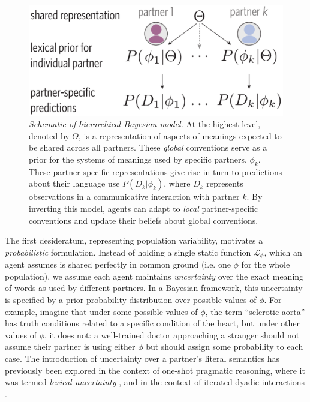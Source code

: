 \begin{figure}[t!]
\centering
\includegraphics[scale=0.35]{./figures/task1_model.pdf}
\vspace{.5em}
\caption{\emph{Schematic of hierarchical Bayesian model.} At the highest level, denoted by $\Theta$, is a representation of aspects of meanings expected to be shared across all partners. These \emph{global} conventions serve as a prior for the systems of meanings used by specific partners, $\phi_k$. These partner-specific representations give rise in turn to predictions about their language use $P(D_k|\phi_k)$, where $D_k$ represents observations in a communicative interaction with partner $k$. By inverting this model, agents can adapt to \emph{local} partner-specific conventions and update their beliefs about global conventions.}
\label{fig:model_schematic}
\end{figure}
The first desideratum, representing population variability, motivates a \emph{probabilistic} formulation.
Instead of holding a single static function $\mathcal{L}_{\phi}$, which an agent assumes is shared perfectly in common ground (i.e. one $\phi$ for the whole population), we assume each agent maintains \emph{uncertainty} over the exact meaning of words as used by different partners.
In a Bayesian framework, this uncertainty is specified by a prior probability distribution over possible values of $\phi$.
For example, imagine that under some possible values of $\phi$, the term ``sclerotic aorta'' has truth conditions related to a specific condition of the heart, but under other values of $\phi$, it does not: a well-trained doctor approaching a stranger should not assume their partner is using either $\phi$ but should assign some probability to each case.
The introduction of uncertainty over a partner's literal semantics has previously been explored in the context of one-shot pragmatic reasoning, where it was termed \emph{lexical uncertainty} \cite{bergen_pragmatic_2016}, and in the context of iterated dyadic interactions \cite{SmithGoodmanFrank13_RecursivePragmaticReasoningNIPS}. 


